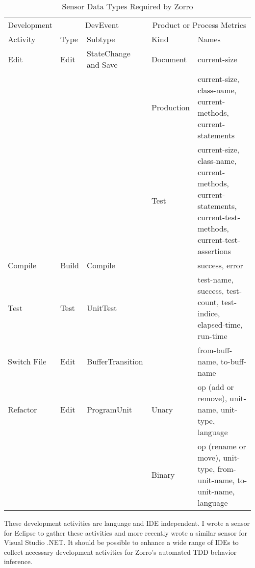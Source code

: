 \begin{table}[htbp]
\centering
  \caption{Sensor Data Types Required by Zorro}
  \begin{tabular}{|p{2cm}|l|p{2.5cm}|l|p{6cm}|} \hline 
   Development & \multicolumn{2}{c|}{DevEvent} & \multicolumn{2}{c|}{Product or Process Metrics} \\ \cline{2-5}
   Activity & Type & Subtype & Kind & Names \\ \hline
   Edit &  Edit & StateChange and Save   & Document   & current-size \\ \cline{4-5}
        &       &                        & Production & current-size, class-name, 
                                                       current-methods, current-statements \\
                                                  \cline{4-5}
        &       &                        &  Test      & current-size, class-name, current-methods, 
                                                        current-statements, current-test-methods, 
                                                        current-test-assertions \\ \hline
   Compile     & Build    & Compile     &          &  success, error   \\ \hline   
   Test        & Test     & UnitTest    &          &  test-name, success, test-count, test-indice, 
                                                     elapsed-time, run-time \\ \hline 
   Switch File  & Edit   & BufferTransition &     & from-buff-name, to-buff-name \\ \hline                                                     
   Refactor    & Edit     & ProgramUnit & Unary    &  op (add or remove), unit-name, unit-type, 
                                                      language\\ \cline{4-5}
               &          &             & Binary   &  op (rename or move), unit-type, from-unit-name,
                                                      to-unit-name, language\\ \hline              
  \end{tabular}
  \label{tab:Zorro.Sensors}
\end{table}

These development activities are language and IDE independent. 
I wrote a sensor for Eclipse to gather these activities and more 
recently wrote a similar sensor for Visual Studio .NET. It 
should be possible to enhance a wide range of IDEs to collect 
necessary development activities for Zorro's automated TDD 
behavior inference.  

